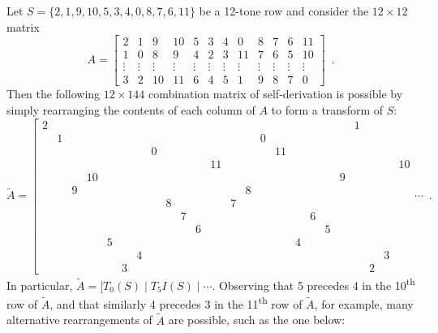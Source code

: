 \begin{example}
	\label{ex:westergaard}
	\cite[102]{Westergaard1966}
	Let $S = \{ 2, 1, 9, 10, 5, 3, 4, 0, 8, 7, 6, 11 \}$ be a 12-tone row and consider the $12 \times 12$ matrix
	\begin{equation}
    	A = \left[
    	\begin{array}{cccccccccccc}
        	2 & 1 & 9 & 10 & 5 & 3 & 4 & 0 & 8 & 7 & 6 & 11 \\
        	1 & 0 & 8 & 9 & 4 & 2 & 3 & 11 & 7 & 6 & 5 & 10 \\
        	\vdots & \vdots & \vdots & \vdots & \vdots & \vdots & \vdots & \vdots & \vdots & \vdots & \vdots & \vdots \\
        	3 & 2 & 10 & 11 & 6 & 4 & 5 & 1 & 9 & 8 & 7 & 0
    	\end{array}
    	\right] \enspace.
	\end{equation}
	Then the following $12 \times 144$ combination matrix of self-derivation is possible by simply rearranging the contents of each column of $A$ to form a transform of $S$:
	\begin{equation}
    	\tilde{A} = \left[
    	\begin{array}{cccccccccccc|cccccccccccc|}
        	2 &&&&&&&&&&&    &  &&&&&&&& 1 &&& \\
        	& 1 &&&&&&&&&&   &  && 0 &&&&&&&&& \\
        	&&&&&&& 0 &&&&   &  &&& 11 &&&&&&&& \\
        	&&&&&&&&&&& 11   &  &&&&&&&&&&& 10 \\
        	&&& 10 &&&&&&&&  &  &&&&&&& 9 &&&& \\
        	&& 9 &&&&&&&&&   &  & 8 &&&&&&&&&& \\
        	&&&&&&&& 8 &&&   &  7 &&&&&&&&&&& \\
        	&&&&&&&&& 7 &&   &  &&&&& 6 &&&&&& \\
        	&&&&&&&&&& 6 &   &  &&&&&& 5 &&&&& \\
        	&&&& 5 &&&&&&&   &  &&&& 4 &&&&&&& \\
        	&&&&&& 4 &&&&&   &  &&&&&&&&&& 3 & \\
        	&&&&& 3 &&&&&&   &  &&&&&&&&& 2 &&
    	\end{array}
    	\cdots \right. \enspace.
	\end{equation}
	In particular, $\tilde{A} = [T_0(S) \; | \; T_5I(S) \; | \; \cdots$. Observing that 5 precedes 4 in the 10\textsuperscript{th} row of $\tilde{A}$, and that similarly 4 precedes 3 in the 11\textsuperscript{th} row of $\tilde{A}$, for example, many alternative rearrangements of $\tilde{A}$ are possible, such as the one below:

\end{example}
